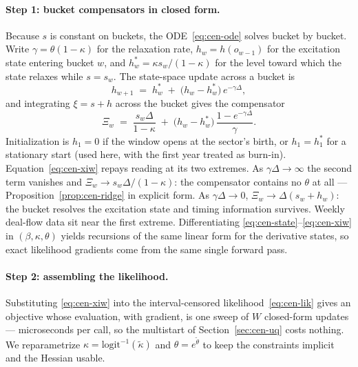 \paragraph{Step 1: bucket compensators in closed form.}
Because $s$ is constant on buckets, the ODE~\eqref{eq:cen-ode} solves bucket by bucket.
Write $\gamma = \theta(1-\kappa)$ for the relaxation rate, $h_w = h(o_{w-1})$ for the
excitation state entering bucket $w$, and $h_w^\ast = \kappa s_w/(1-\kappa)$ for the
level toward which the state relaxes while $s = s_w$. The state-space update across a
bucket is
\begin{equation}
\label{eq:cen-state}
h_{w+1} \;=\; h_w^\ast \;+\; \bigl(h_w - h_w^\ast\bigr)\, e^{-\gamma \Delta},
\end{equation}
and integrating $\xi = s + h$ across the bucket gives the compensator
\begin{equation}
\label{eq:cen-xiw}
\Xi_w \;=\; \frac{s_w \Delta}{1-\kappa}
\;+\; \bigl(h_w - h_w^\ast\bigr)\, \frac{1 - e^{-\gamma\Delta}}{\gamma}.
\end{equation}
Initialization is $h_1 = 0$ if the window opens at the sector's birth, or $h_1 =
h_1^\ast$ for a stationary start (used here, with the first year treated as burn-in).
Equation~\eqref{eq:cen-xiw} repays reading at its two extremes. As $\gamma\Delta \to
\infty$ the second term vanishes and $\Xi_w \to s_w\Delta/(1-\kappa)$: the compensator
contains no $\theta$ at all --- Proposition~\ref{prop:cen-ridge} in explicit form. As
$\gamma\Delta \to 0$, $\Xi_w \to \Delta(s_w + h_w)$: the bucket resolves the excitation
state and timing information survives. Weekly deal-flow data sit near the first extreme.
Differentiating \eqref{eq:cen-state}--\eqref{eq:cen-xiw} in $(\beta,\kappa,\theta)$
yields recursions of the same linear form for the derivative states, so exact likelihood
gradients come from the same single forward pass.

\paragraph{Step 2: assembling the likelihood.}
Substituting \eqref{eq:cen-xiw} into the interval-censored
likelihood~\eqref{eq:cen-lik} gives an objective whose evaluation, with gradient, is one
sweep of $W$ closed-form updates --- microseconds per call, so the multistart of
Section~\ref{sec:cen-uq} costs nothing. We reparametrize $\kappa =
\mathrm{logit}^{-1}(\tilde\kappa)$ and $\theta = e^{\tilde\theta}$ to keep the
constraints implicit and the Hessian usable.

